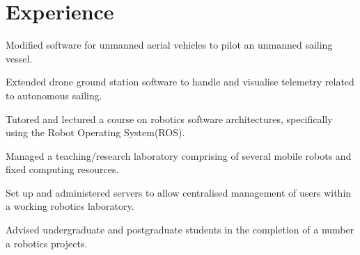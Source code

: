 \documentclass[a4paper]{awesome-deedy}
\begin{document}
\begin{minipage}[t]{0.66\textwidth} 


\section{Experience}

\vspace{\topsep} %
\begin{tightemize}
\item Modified software for unmanned aerial vehicles to pilot an unmanned sailing vessel.
\item Extended drone ground station software to handle and visualise telemetry related to autonomous sailing.
\end{tightemize}
\sectionsep

\begin{tightemize}
\item Tutored and lectured a course on robotics software architectures, specifically using the Robot Operating System(ROS).
\item Managed a teaching/research laboratory comprising of several mobile robots and fixed computing resources.
\item Set up and administered servers to allow centralised management of users within a working robotics laboratory.
\item Advised undergraduate and postgraduate students in the completion of a number a robotics projects.
\end{tightemize}
\sectionsep


\end{minipage}
\end{document}
